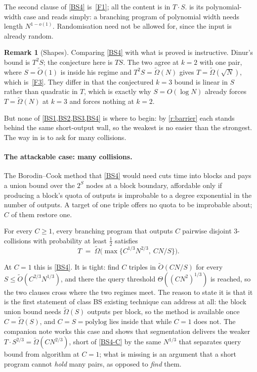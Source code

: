 \documentclass[11pt]{article}
\theoremstyle{plain}
\theoremstyle{definition}
\newtheorem{remark}{Remark}
\newenvironment{conj}[1]%
  {\renewcommand{\theinnerconj}{#1}%
   \def\theHinnerconj{conj.\arabic{innerconj}}\innerconj}{\endinnerconj}
\newcommand{\cls}[1]{\textsf{#1}}   %
\begin{document}
The second clause of \cref{BS4} is~\ref{F1}; all the content is in
$T\cdot S$.   is its polynomial-width case and reads simply: a
branching program of polynomial width needs length $N^{1-o(1)}$.
Randomisation need not be allowed for, since the input is already random.

\begin{remark}[Shapes]\label{r:shapes}
Comparing \cref{BS4} with what is proved is instructive.  Dinur's bound is
$T^2 S$; the conjecture here is $T S$.  The two agree at $k=2$ with one
pair, where $S = \tilde O(1)$ is inside his regime and $T^2S =
\tilde\Omega(N)$ gives $T = \tilde\Omega(\sqrt N)$, which is~\ref{F3}.
They differ in that the conjectured $k=3$ bound is linear in $S$ rather
than quadratic in $T$, which is exactly why $S = O(\log N)$ already forces
$T = \tilde\Omega(N)$ at $k=3$ and forces nothing at $k=2$.
\end{remark}
But none of \cref{BS1,BS2,BS3,BS4} is where to begin: by \cref{r:barrier}
each stands behind the same short-output wall, so the weakest is no easier
than the strongest.  The way in is to ask for many collisions.


\paragraph{The attackable case: many collisions.}\label{sec:cfold}
The Borodin--Cook method that \cref{BS4} would need cuts time into blocks and pays
a union bound over the $2^S$ nodes at a block boundary, affordable only if
producing a block's quota of outputs is improbable to a degree exponential
in the number of outputs.  A target of one triple offers no quota to be
improbable about; $C$ of them restore one.

\begin{conj}{BS4-C}[$C$ disjoint triples]\label{BS4-C}
For every $C \geq 1$, every branching program that outputs $C$ pairwise
disjoint $3$-collisions with probability at least $\tfrac12$ satisfies
\[
  T \;=\; \tilde\Omega\bigl(\max\{C^{1/3}N^{2/3},\ CN/S\}\bigr).
\]
\end{conj}

At $C=1$ this is \cref{BS4}.  It is tight: \cite{GNY25} find $C$ triples in
$\tilde O(CN/S)$ for every $S\leq\tilde O(C^{2/3}N^{1/3})$, and there the
query threshold $\Theta((CN^2)^{1/3})$ is reached, so the two clauses cross
where the two regimes meet.  The reason to state it is that it is the first
statement of class \cls{BS} existing technique can address at all: the block
union bound needs $\tilde\Omega(S)$ outputs per block, so the method is
available once $C=\tilde\Omega(S)$, and $C=S=\mathrm{polylog}$ lies inside
that while $C=1$ does not.  The companion note \cite{Note2} works this case
and shows that segmentation delivers the weaker
$T\cdot S^{2/3}=\tilde\Omega(CN^{2/3})$, short of \cref{BS4-C} by the same
$N^{1/3}$ that separates query bound from algorithm at $C=1$; what is
missing is an argument that a short program cannot \emph{hold} many pairs,
as opposed to \emph{find} them.
\end{document}

